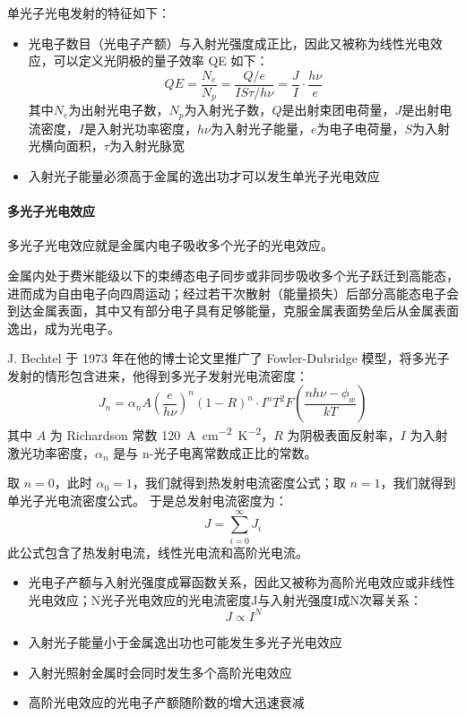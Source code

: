 单光子光电发射的特征如下：
\begin{itemize}
	  \item 光电子数目（光电子产额）与入射光强度成正比，因此又被称为线性光电效应，可以定义光阴极的量子效率 QE 如下：
	  \begin{equation}
	  QE = \frac{N_e}{N_p} = \frac{Q/e}{IS\tau/h\nu} = \frac{J}{I}\cdot\frac{h\nu}{e}
	  \end{equation}
	  其中$N_e$为出射光电子数，$N_p$为入射光子数，$Q$是出射束团电荷量，$J$是出射电流密度，$I$是入射光功率密度，$h\nu$为入射光子能量，$e$为电子电荷量，$S$为入射光横向面积，$\tau$为入射光脉宽
	  \item 入射光子能量必须高于金属的逸出功才可以发生单光子光电效应
\end{itemize}

\paragraph{多光子光电效应}
多光子光电效应就是金属内电子吸收多个光子的光电效应。

金属内处于费米能级以下的束缚态电子同步或非同步吸收多个光子跃迁到高能态，进而成为自由电子向四周运动；经过若干次散射（能量损失）后部分高能态电子会到达金属表面，其中又有部分电子具有足够能量，克服金属表面势垒后从金属表面逸出，成为光电子。

	J. Bechtel 于 1973 年在他的博士论文里推广了 Fowler-Dubridge 模型，将多光子发射的情形包含进来，他得到多光子发射光电流密度：
\begin{equation}
J_n = \alpha_nA\left(\frac{e}{h\nu}\right)^n(1-R)^n\cdot I^nT^2F\left(\frac{nh\nu-\phi_w}{kT}\right)
\end{equation}
其中 $A$ 为 Richardson 常数 \SI{120}{A.cm^{-2}.K^{-2}}，$R$ 为阴极表面反射率，$I$ 为入射激光功率密度，$\alpha_n$ 是与 n-光子电离常数成正比的常数。
	
	取 $n=0$，此时 $\alpha_0 = 1$，我们就得到热发射电流密度公式；取 $n=1$，我们就得到单光子光电流密度公式。
	于是总发射电流密度为：
	\begin{equation}
	J = \sum_{i = 0}^{\infty}J_i
	\end{equation}
	此公式包含了热发射电流，线性光电流和高阶光电流。

\begin{itemize}
  \item 光电子产额与入射光强度成幂函数关系，因此又被称为高阶光电效应或非线性光电效应；N光子光电效应的光电流密度J与入射光强度I成N次幂关系：
	  \[
	  J \propto I^N
	  \]
  \item 入射光子能量小于金属逸出功也可能发生多光子光电效应
  \item 入射光照射金属时会同时发生多个高阶光电效应
  \item 高阶光电效应的光电子产额随阶数的增大迅速衰减
\end{itemize}


